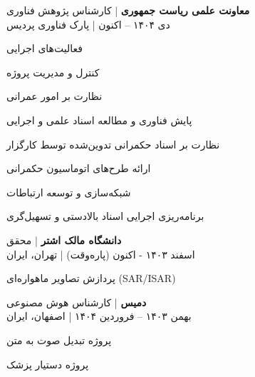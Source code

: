 \documentclass[a4paper]{deedy-persian} %
\begin{document}
\begin{minipage}[t]{0.62\textwidth}
\textbf{معاونت علمی ریاست جمهوری} | کارشناس پژوهش فناوری \\
\vspace{\itemsep}
دی ۱۴۰۴ – اکنون | پارک فناوری پردیس
\begin{RTL}
\begin{tightitemize}
\item فعالیت‌های اجرایی
\item کنترل و مدیریت پروژه
\item نظارت بر امور عمرانی
\item پایش فناوری و مطالعه اسناد علمی و اجرایی
\item نظارت بر اسناد حکمرانی تدوین‌شده توسط کارگزار
\item ارائه طرح‌های اتوماسیون حکمرانی
\item شبکه‌سازی و توسعه ارتباطات
\item برنامه‌ریزی اجرایی اسناد بالادستی و تسهیل‌گری
\end{tightitemize}
\end{RTL}
\vspace{\topsep}

\textbf{دانشگاه مالک اشتر} | محقق \\
\vspace{\itemsep} 
اسفند ۱۴۰۳ - اکنون (پاره‌وقت) | تهران، ایران
\begin{RTL}
\begin{tightitemize}
\item پردازش تصاویر ماهواره‌ای (SAR/ISAR)
\end{tightitemize}
\end{RTL}
\vspace{\topsep} 

\textbf{دمیس} | کارشناس هوش مصنوعی \\
\vspace{\itemsep} 
بهمن ۱۴۰۳ – فروردین ۱۴۰۴ | اصفهان، ایران
\vspace{\itemsep}
\begin{RTL}
\begin{tightitemize}
\item پروژه تبدیل صوت به متن 
\item پروژه دستیار پزشک 
\end{tightitemize}
\end{RTL}
\vspace{\topsep}


\end{minipage}
\end{document}
